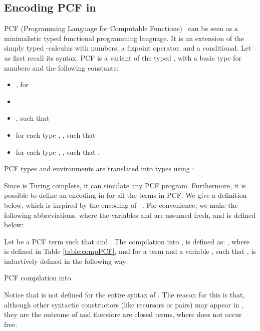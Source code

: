\documentclass{article}
\begin{document}
\subsection{Encoding PCF  in \LLCIrec}

PCF (Programming Language for Computable
Functions)~\cite{Plotkin77} can be seen as a minimalistic typed
 functional
programming language.
It is an extension of the simply typed -calculus with numbers, 
a fixpoint operator, and a conditional.
Let us first recall its syntax.  PCF  is a variant of the typed \lam,
with a basic type  for numbers and the following constants:
\begin{itemize}
\item , for 
\item 
\item , such that

\item for each type , ,
such that

\item for each type , , such that
.
\end{itemize}

\begin{definition}
PCF types and environments are translated into \LLCIrec types using :\\

\end{definition}
Since \LLCIrec is Turing complete, it can simulate any PCF program. Furthermore, it is possible to define an encoding in \LLCIrec for all the terms in PCF. We give a definition below, which is inspired by
the encoding of \ST~\cite{AlvesS:TCS}. For convenience, we make the
following abbreviations, where the variables  and  are assumed
fresh, and  is defined below:

\begin{definition}
Let  be a PCF term such that  and
.  The compilation into \LLCIrec, is
defined as: , where  is defined in Table
\ref{table:compPCF}, and for a term  and a variable , such that
,  is inductively defined in the following
way:
 

\begin{table*}
\caption{PCF compilation into }\label{table:compPCF}
\end{table*}
Notice that  is not defined for the entire syntax of \LLCIrec.
The reason for this is that, although other syntactic constructors (like
recursors or pairs) may appear in , they are the outcome of
 and therefore are closed terms, where  does not occur
free.
\end{definition}
\end{document}
